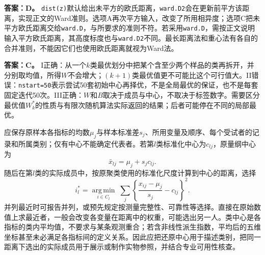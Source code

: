 \textbf{答案：D。} \texttt{dist(z)}默认给出未平方的欧氏距离，\texttt{ward.D2}会在更新前平方该距离，实现正文的Ward准则。选项A再次平方输入，改变了所用相异度；选项C把未平方欧氏距离交给\texttt{ward.D}，与所要求的准则不符。若采用\texttt{ward.D}，需按正文说明输入平方欧氏距离，其高度标度也与\texttt{ward.D2}不同。最长距离法和重心法有各自的合并准则，不能因它们也使用欧氏距离就视为Ward法。
\par\nobreak\smallskip{}

\textbf{答案：C。} I正确：从一个$k$类最优划分中把某个含至少两个样品的类再拆开，并分别取均值，所得$W$不会增大；$(k+1)$类最优值更不可能比这个可行值大。II错误：\texttt{nstart=50}表示尝试50套初始中心再择优，不是全局最优的保证，也不是每套固定迭代50次。III正确：$W$和$B$取决于成员与中心，不取决于标签数字。需要区分最优值$W_k^\ast$的性质与有限次随机算法实际返回的结果；后者可能停在不同的局部最优。
\par\nobreak\smallskip{}

应保存原样本各指标的均数$\mu_j$与样本标准差$s_j$、所用变量及顺序、每个受试者的记录和所属类别；仅有中心不能确定代表者。若第$l$类标准化中心为$c_{lj}$，原量纲中心为\[\bar x_{lj}=\mu_j+s_jc_{lj}.\]随后在第$l$类的实际成员中，按原聚类使用的标准化尺度计算到中心的距离，选择\[i_l^\ast=\underset{i\in C_l}{\operatorname{arg\,min}}\;\sum_j\left\{\frac{x_{ij}-\mu_j}{s_j}-c_{lj}\right\}^2.\]并列最近时可报告并列，或预先规定按测量完整性、可靠性等选择。直接在原始数值上求最近者，一般会改变各变量在距离中的权重，可能选出另一人。类中心是各指标的类内平均值，不要求与某条观测重合；若含非线性派生指数，平均后的五维坐标甚至未必满足各指标间的定义关系。因此应把还原中心用于描述类别，把同一距离下选出的实际成员用于展示或制作实物参照，并结合专业可用性核查。
\par\nobreak\smallskip{}

